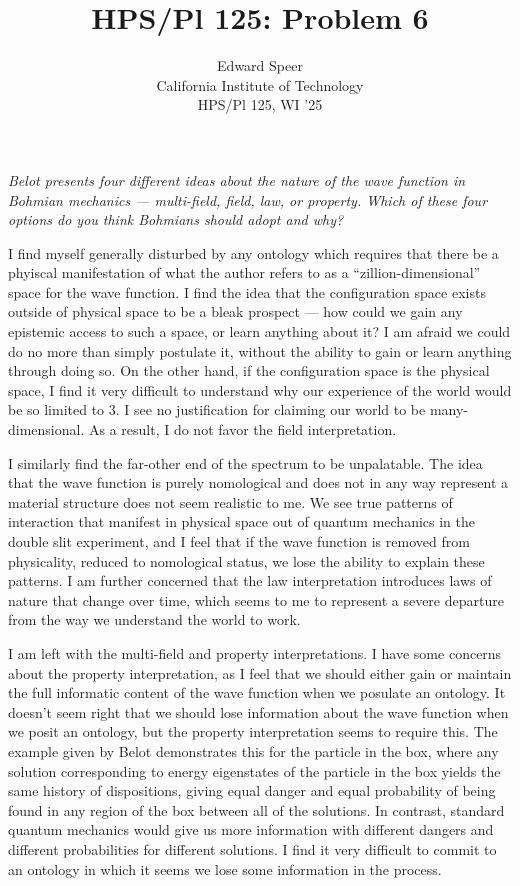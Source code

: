 \documentclass[11pt, a4paper]{article}
\title{HPS/Pl 125: Problem 6}
\author{%
  Edward Speer
  \\
  California Institute of Technology\\
  HPS/Pl 125, WI '25 \\
}
\date{\monthyeardate}
\begin{document}
\maketitle

\noindent \emph{Belot presents four different ideas about the nature of the wave
function in Bohmian mechanics — multi-field, field, law, or property. Which of
these four options do you think Bohmians should adopt and why?}

I find myself generally disturbed by any ontology which requires that there be
a phyiscal manifestation of what the author refers to as a
``zillion-dimensional'' space for the wave function. I find the idea that the 
configuration space exists outside of physical space to be a bleak prospect — 
how could we gain any epistemic access to such a space, or learn anything about
it? I am afraid we could do no more than simply postulate it, without the
ability to gain or learn anything through doing so. On the other hand, if the
configuration space is the physical space, I find it very difficult to
understand why our experience of the world would be so limited to 3. I see no
justification for claiming our world to be many-dimensional. As a result, I do
not favor the field interpretation.

I similarly find the far-other end of the spectrum to be unpalatable. The idea 
that the wave function is purely nomological and does not in any way represent 
a material structure does not seem realistic to me. We see true patterns of 
interaction that manifest in physical space out of quantum mechanics in the 
double slit experiment, and I feel that if the wave function is removed from
physicality, reduced to nomological status, we lose the ability to explain
these patterns. I am further concerned that the law interpretation introduces
laws of nature that change over time, which seems to me to represent a severe
departure from the way we understand the world to work.

I am left with the multi-field and property interpretations. I have some
concerns about the property interpretation, as I feel that we should either gain
or maintain the full informatic content of the wave function when we posulate an
ontology. It doesn't seem right that we should lose information about the
wave function when we posit an ontology, but the property interpretation seems
to require this. The example given by Belot demonstrates this for the particle
in the box, where any solution corresponding to energy eigenstates of the
particle in the box yields the same history of dispositions, giving equal danger
and equal probability of being found in any region of the box between all of the
solutions. In contrast, standard quantum mechanics would give us more
information with different dangers and different probabilities for different
solutions. I find it very difficult to commit to an ontology in which it seems
we lose some information in the process.
\end{document}

